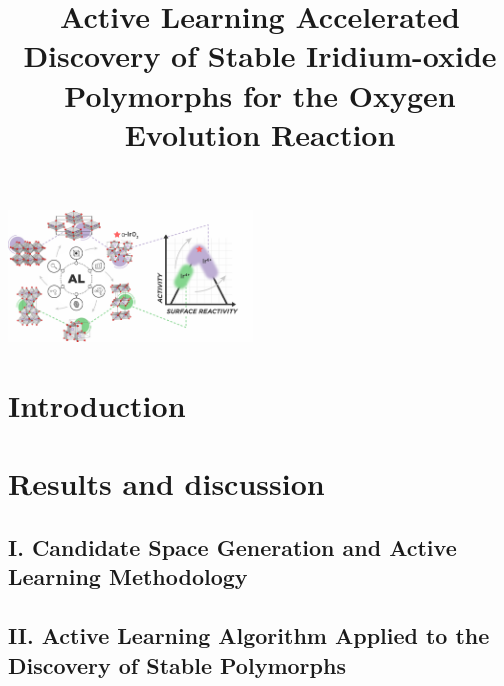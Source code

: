 \documentclass[%
  journal=cmatex,  %
  manuscript=article,
  ]{achemso}
\title[ML discovered \IrOx phases]{
Active Learning Accelerated Discovery of Stable Iridium-oxide Polymorphs for the Oxygen Evolution Reaction
}
\begin{document}
\begin{tocentry}
\begin{center}
\includegraphics[height=3.5cm]{02_figures/toc_figure/Raul_TOC__v1__v0__1200dpi.png}
\end{center}
\end{tocentry}



\newpage
\begin{abstract}

\end{abstract}
\newpage

\section{Introduction}


\section{Results and discussion}

  \subsection{I. Candidate Space Generation and Active Learning Methodology}
  

  \subsection{II. Active Learning Algorithm Applied to the Discovery of Stable \IrOx Polymorphs}
  
\end{document}
